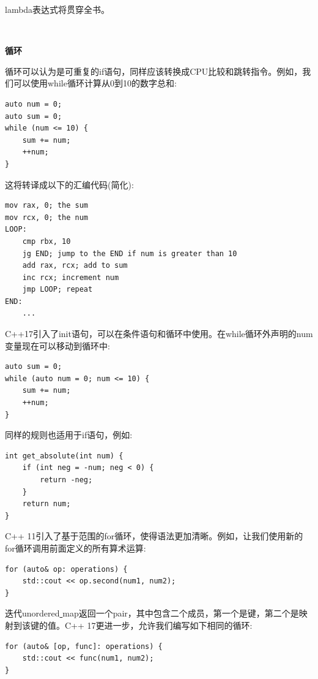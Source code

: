 lambda表达式将贯穿全书。

\noindent\textbf{}\ \par
\textbf{循环} \ \par
循环可以认为是可重复的if语句，同样应该转换成CPU比较和跳转指令。例如，我们可以使用while循环计算从0到10的数字总和: \par

\begin{lstlisting}[caption={}]
auto num = 0;
auto sum = 0;
while (num <= 10) {
	sum += num;
	++num;
}
\end{lstlisting}

这将转译成以下的汇编代码(简化): \par

\begin{lstlisting}[caption={}]
mov rax, 0; the sum
mov rcx, 0; the num
LOOP:
	cmp rbx, 10
	jg END; jump to the END if num is greater than 10
	add rax, rcx; add to sum
	inc rcx; increment num
	jmp LOOP; repeat
END:
	...
\end{lstlisting}

C++17引入了init语句，可以在条件语句和循环中使用。在while循环外声明的num变量现在可以移动到循环中: \par

\begin{lstlisting}[caption={}]
auto sum = 0;
while (auto num = 0; num <= 10) {
	sum += num;
	++num;
}
\end{lstlisting}

同样的规则也适用于if语句，例如: \par

\begin{lstlisting}[caption={}]
int get_absolute(int num) {
	if (int neg = -num; neg < 0) {
		return -neg;
	}
	return num;
}
\end{lstlisting}

C++ 11引入了基于范围的for循环，使得语法更加清晰。例如，让我们使用新的for循环调用前面定义的所有算术运算: \par

\begin{lstlisting}[caption={}]
for (auto& op: operations) {
	std::cout << op.second(num1, num2);
}
\end{lstlisting}

迭代unordered\underline{ }map返回一个pair，其中包含二个成员，第一个是键，第二个是映射到该键的值。C++ 17更进一步，允许我们编写如下相同的循环: \par

\begin{lstlisting}[caption={}]
for (auto& [op, func]: operations) {
	std::cout << func(num1, num2);
}
\end{lstlisting}

